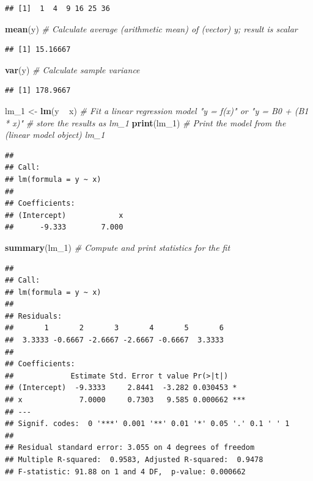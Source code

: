 \documentclass[]{book}
\newenvironment{Shaded}{\begin{snugshade}}{\end{snugshade}}
\newcommand{\KeywordTok}[1]{\textcolor[rgb]{0.13,0.29,0.53}{\textbf{{#1}}}}
\newcommand{\StringTok}[1]{\textcolor[rgb]{0.31,0.60,0.02}{{#1}}}
\newcommand{\CommentTok}[1]{\textcolor[rgb]{0.56,0.35,0.01}{\textit{{#1}}}}
\newcommand{\NormalTok}[1]{{#1}}
\begin{document}
\begin{verbatim}
## [1]  1  4  9 16 25 36
\end{verbatim}

\begin{Shaded}
\begin{Highlighting}[]
\KeywordTok{mean}\NormalTok{(y)               }\CommentTok{# Calculate average (arithmetic mean) of (vector) y; result is scalar}
\end{Highlighting}
\end{Shaded}

\begin{verbatim}
## [1] 15.16667
\end{verbatim}

\begin{Shaded}
\begin{Highlighting}[]
\KeywordTok{var}\NormalTok{(y)                }\CommentTok{# Calculate sample variance}
\end{Highlighting}
\end{Shaded}

\begin{verbatim}
## [1] 178.9667
\end{verbatim}

\begin{Shaded}
\begin{Highlighting}[]
\NormalTok{lm_1 <-}\StringTok{ }\KeywordTok{lm}\NormalTok{(y ~}\StringTok{ }\NormalTok{x)     }\CommentTok{# Fit a linear regression model "y = f(x)" or "y = B0 + (B1 * x)"}
                      \CommentTok{# store the results as lm_1}
\KeywordTok{print}\NormalTok{(lm_1)           }\CommentTok{# Print the model from the (linear model object) lm_1}
\end{Highlighting}
\end{Shaded}

\begin{verbatim}
## 
## Call:
## lm(formula = y ~ x)
## 
## Coefficients:
## (Intercept)            x  
##      -9.333        7.000
\end{verbatim}

\begin{Shaded}
\begin{Highlighting}[]
\KeywordTok{summary}\NormalTok{(lm_1)         }\CommentTok{# Compute and print statistics for the fit}
\end{Highlighting}
\end{Shaded}

\begin{verbatim}
## 
## Call:
## lm(formula = y ~ x)
## 
## Residuals:
##       1       2       3       4       5       6 
##  3.3333 -0.6667 -2.6667 -2.6667 -0.6667  3.3333 
## 
## Coefficients:
##             Estimate Std. Error t value Pr(>|t|)    
## (Intercept)  -9.3333     2.8441  -3.282 0.030453 *  
## x             7.0000     0.7303   9.585 0.000662 ***
## ---
## Signif. codes:  0 '***' 0.001 '**' 0.01 '*' 0.05 '.' 0.1 ' ' 1
## 
## Residual standard error: 3.055 on 4 degrees of freedom
## Multiple R-squared:  0.9583, Adjusted R-squared:  0.9478 
## F-statistic: 91.88 on 1 and 4 DF,  p-value: 0.000662
\end{verbatim}
\end{document}
